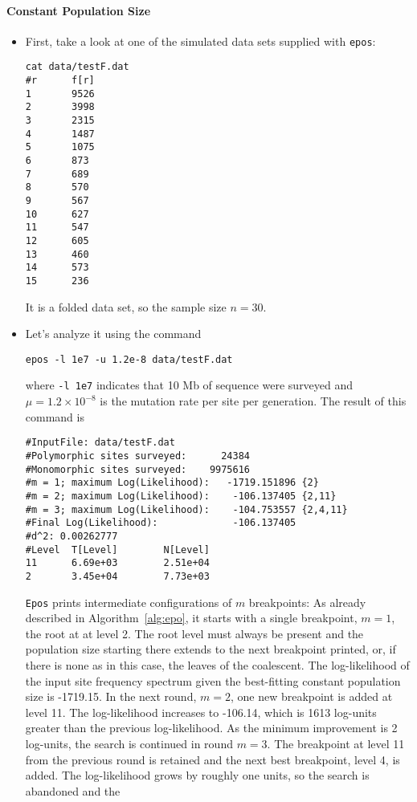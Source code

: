 \documentclass[a4paper, english]{article}
\newcommand{\ty}{\texttt}
\begin{document}
\paragraph{Constant Population Size}
\begin{itemize}
\item First, take a look at one of the simulated data sets supplied
  with \ty{epos}:
\begin{verbatim}
cat data/testF.dat
#r      f[r]
1       9526
2       3998
3       2315
4       1487
5       1075
6       873
7       689
8       570
9       567
10      627
11      547
12      605
13      460
14      573
15      236
\end{verbatim}
It is a folded data set, so the sample size $n=30$.
\item Let's analyze it using the command
\begin{verbatim}
epos -l 1e7 -u 1.2e-8 data/testF.dat 
\end{verbatim}
where \ty{-l 1e7} indicates that 10 Mb of sequence were surveyed and
$\mu=1.2\times 10^{-8}$ is the mutation rate per site per generation. The result of this command is
\begin{verbatim}
#InputFile: data/testF.dat
#Polymorphic sites surveyed:      24384
#Monomorphic sites surveyed:    9975616
#m = 1; maximum Log(Likelihood):   -1719.151896 {2}
#m = 2; maximum Log(Likelihood):    -106.137405 {2,11}
#m = 3; maximum Log(Likelihood):    -104.753557 {2,4,11}
#Final Log(Likelihood):             -106.137405
#d^2: 0.00262777
#Level  T[Level]        N[Level]
11      6.69e+03        2.51e+04
2       3.45e+04        7.73e+03
\end{verbatim}
\ty{Epos} prints intermediate configurations of $m$ breakpoints: As
already described in Algorithm~\ref{alg:epo}, it starts with a single
breakpoint, $m=1$, the root at at level 2. The root level must always
be present and the population size starting there extends to the next
breakpoint printed, or, if there is none as in this case, the leaves
of the coalescent. The log-likelihood of the input site frequency
spectrum given the best-fitting constant population size is
-1719.15. In the next round, $m=2$, one new breakpoint is added at
level 11. The log-likelihood increases to -106.14, which is 
1613 log-units greater than the previous log-likelihood. As the minimum
improvement is 2 log-units, the search is continued in round
$m=3$. The breakpoint at level 11 from the previous round is retained
and the next best breakpoint, level 4, is added. The log-likelihood
grows by roughly one units, so the search is abandoned and the

\end{itemize}
\end{document}

